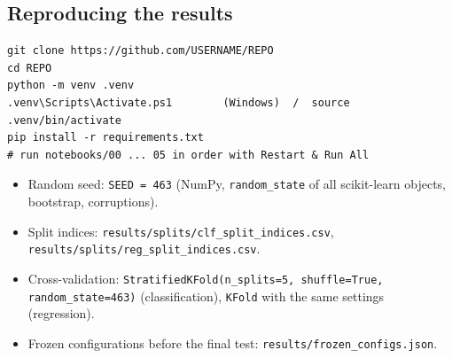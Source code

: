 \documentclass[11pt,a4paper]{article}
\begin{document}
\subsection*{Reproducing the results}
\begin{lstlisting}
git clone https://github.com/USERNAME/REPO
cd REPO
python -m venv .venv
.venv\Scripts\Activate.ps1        (Windows)  /  source .venv/bin/activate
pip install -r requirements.txt
# run notebooks/00 ... 05 in order with Restart & Run All
\end{lstlisting}

\begin{itemize}
  \item Random seed: \texttt{SEED = 463} (NumPy, \texttt{random\_state} of all scikit-learn objects, bootstrap, corruptions).
  \item Split indices: \texttt{results/splits/clf\_split\_indices.csv}, \texttt{results/splits/reg\_split\_indices.csv}.
  \item Cross-validation: \texttt{StratifiedKFold(n\_splits=5, shuffle=True, random\_state=463)} (classification), \texttt{KFold} with the same settings (regression).
  \item Frozen configurations before the final test: \texttt{results/frozen\_configs.json}.
\end{itemize}

\nocite{*}  %


\end{document}
